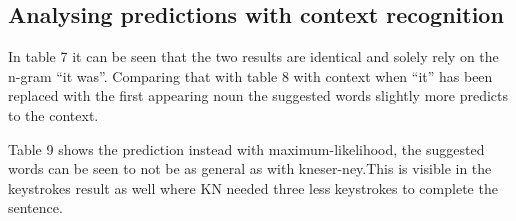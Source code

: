 \subsection{Analysing predictions with context recognition}
In table 7 it can be seen that the two results are identical and solely rely on the n-gram “it was”. Comparing that with table 8 with context when “it” has been replaced with the first appearing noun the suggested words slightly more predicts to the context.

Table 9 shows the prediction instead with maximum-likelihood, the suggested words can be seen to not be as general as with kneser-ney.This is visible in the keystrokes result as well where KN needed three less keystrokes to complete the sentence.